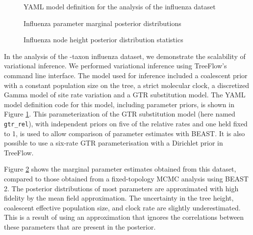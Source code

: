\begin{figure}

    \inputminted{yaml}{\VAR{ flu_yaml_file }}

    \label{fig:fluyaml}
    \caption{YAML model definition for the analysis of the influenza dataset}
\end{figure}

\begin{figure}
    \centering
    \caption{Influenza parameter marginal posterior distributions}
    \label{fig:flumarginals}
\end{figure}

\begin{figure}
    \centering
    \caption{Influenza node height posterior distribution statistics}
    \label{fig:flutree}
\end{figure}



In the analysis of the -taxon influenza dataset, we demonstrate the scalability of variational inference. We performed variational inference using TreeFlow's command line interface. The model used for inference included a coalescent prior with a constant population size on the tree, a strict molecular clock, a discretized Gamma model of site rate variation and a GTR substitution model. The YAML model definition code for this model, including parameter priors, is shown in Figure \ref{fig:fluyaml}. This parameterization of the GTR substitution model (here named \texttt{gtr\_rel}), with independent priors on five of the relative rates and one held fixed to 1, is used to allow comparison of parameter estimates with BEAST. It is also possible to use a six-rate GTR parameterisation with a Dirichlet prior in TreeFlow.

Figure \ref{fig:flumarginals} shows the marginal parameter estimates obtained from this dataset, compared to those obtained from a fixed-topology MCMC analysis using BEAST 2. The posterior distributions of most parameters are approximated with high fidelity by the mean field approximation. The uncertainty in the tree height, coalescent effective population size, and clock rate are slightly underestimated. This is a result of using an approximation that ignores the correlations between these parameters that are present in the posterior.

